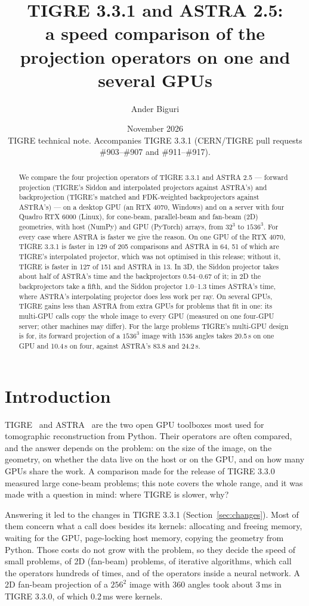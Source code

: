 \documentclass[11pt,a4paper]{article}
\title{TIGRE 3.3.1 and ASTRA 2.5:\\a speed comparison of the projection operators on one and several GPUs}
\author{Ander Biguri}
\affil{Department of Applied Mathematics and Theoretical Physics (DAMTP), University of Cambridge}
\date{November 2026\\[4pt]\small TIGRE technical note. Accompanies TIGRE 3.3.1 (CERN/TIGRE pull requests \#903--\#907 and \#911--\#917).}
\begin{document}
\maketitle

\begin{abstract}
We compare the four projection operators of TIGRE 3.3.1 and ASTRA 2.5 --- forward projection (TIGRE's Siddon
and interpolated projectors against ASTRA's) and backprojection (TIGRE's matched and FDK-weighted
backprojectors against ASTRA's) --- on a desktop GPU (an RTX 4070, Windows) and on a server with four Quadro
RTX 6000 (Linux), for cone-beam, parallel-beam and fan-beam (2D) geometries, with host (NumPy) and GPU (PyTorch)
arrays, from $32^3$ to $1536^3$. For every case where ASTRA is faster we give the reason. On one GPU of the RTX
4070, TIGRE 3.3.1 is faster in 129 of 205 comparisons and ASTRA in 64, 51 of which are TIGRE's interpolated
projector, which was not optimised in this release; without it, TIGRE is faster in 127 of 151 and ASTRA in 13.
In 3D, the Siddon projector takes about half of ASTRA's time and the backprojectors 0.54--0.67 of it; in 2D the
backprojectors take a fifth, and the Siddon projector 1.0--1.3 times ASTRA's time, where ASTRA's interpolating
projector does less work per ray. On several GPUs, TIGRE gains less than ASTRA from extra GPUs for problems that
fit in one: its multi-GPU calls copy the whole image to every GPU (measured on one four-GPU server; other
machines may differ). For the large problems TIGRE's multi-GPU
design is for, its forward projection of a $1536^3$ image with 1536 angles takes 20.5\,s on one GPU and 10.4\,s
on four, against ASTRA's 83.8 and 24.2\,s.
\end{abstract}

\section{Introduction}
TIGRE~\cite{tigre2016,tigre2020multigpu,tigre2025v3} and ASTRA~\cite{astra2016} are the two open GPU toolboxes
most used for tomographic reconstruction from Python. Their operators are often compared, and the answer
depends on the problem: on the size of the image, on the geometry, on whether the data live on the host or on
the GPU, and on how many GPUs share the work. A comparison made for the release of TIGRE 3.3.0 measured large
cone-beam problems; this note covers the whole range, and it was made with a question in mind: where TIGRE is
slower, why?

Answering it led to the changes in TIGRE 3.3.1 (Section~\ref{sec:changes}). Most of them concern what a call does
besides its kernels: allocating and freeing memory, waiting for the GPU, page-locking host memory, copying the
geometry from Python. Those costs do not grow with the problem, so they decide the speed of small problems, of
2D (fan-beam) problems, of iterative algorithms, which call the operators hundreds of times, and of the
operators inside a neural network. A 2D fan-beam projection of a $256^2$ image with 360 angles took about 3\,ms in
TIGRE 3.3.0, of which 0.2\,ms were kernels.
\end{document}
